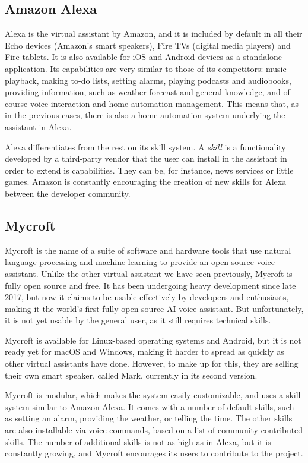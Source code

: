 \subsection{Amazon Alexa}
Alexa is the virtual assistant by Amazon, and it is included by default in all their Echo devices (Amazon's smart speakers), Fire TVs
(digital media players) and Fire tablets. It is also available for iOS and Android devices as a standalone application. Its capabilities are
very similar to those of its competitors: music playback, making to-do lists, setting alarms, playing podcasts and audiobooks, providing 
information, such as weather forecast and general knowledge, and of course voice interaction and home automation management.
This means that, as in the previous cases, there is also a home automation system underlying the assistant in Alexa.

Alexa differentiates from the rest on its skill system. A \textit{skill} is a functionality developed by a third-party vendor that the user
can install in the assistant in order to extend is capabilities. They can be, for instance, news services or little games. Amazon is 
constantly encouraging the creation of new skills for Alexa between the developer community.\cite{amazonAlexa}

\subsection{Mycroft}
Mycroft is the name of a suite of software and hardware tools that use natural language processing and machine learning to provide
an open source voice assistant.\cite{mycroftDocumentation} Unlike the other virtual assistant we have seen previously, Mycroft is
fully open source and free. It has been undergoing heavy development since late 2017, but now it claims to be usable effectively 
by developers and enthusiasts, making it the world's first fully open source AI voice assistant. But unfortunately, it is not yet usable
by the general user, as it still requires technical skills.

Mycroft is available for Linux-based operating systems and Android, but it is not ready yet for macOS and Windows, making it harder 
to spread as quickly as other virtual assistants have done. However, to make up for this, they are selling their own smart speaker, 
called Mark, currently in its second version.

Mycroft is modular, which makes the system easily customizable, and uses a skill system similar to Amazon Alexa. It comes with a 
number of default skills, such as setting an alarm, providing the weather, or telling the time. The other skills are also installable via 
voice commands, based on a list of community-contributed skills. The number of additional skills is not as high as in Alexa, but it
is constantly growing, and Mycroft encourages its users to contribute to the project.

